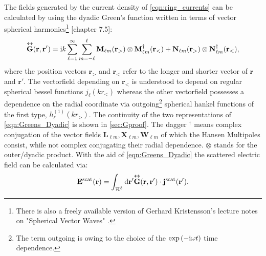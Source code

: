 The fields generated by the current density of \cref{eqn:ring_currents} can be
calculated by using the dyadic Green's function written in terms of vector spherical harmonics\footnote{There is also a freely available version of Gerhard Kristensson's lecture notes on "Spherical Vector Waves" \citep{Kristensson2014}.} \Cite{Kristensson2016}[chapter 7.5]:
\begin{equation}
\overset{\bm\leftrightarrow}{\mathbf{G}}(\mathbf{r},\mathbf{r}') = \mathrm{i} k \sum_{\ell=1}^\infty \sum_{m=-\ell}^\ell
\mathbf{M}_{\ell m}(\mathbf{r}_>)\otimes\mathbf{M}_{\ell m}^\dagger(\mathbf{r}_<)+
\mathbf{N}_{\ell m}(\mathbf{r}_>)\otimes\mathbf{N}_{\ell m}^\dagger(\mathbf{r}_<),
\label{eqn:Greens_Dyadic}
\end{equation}
where the position vectors $\mathbf{r}_>$ and $\mathbf{r}_<$ refer to the longer and shorter vector of $\mathbf{r}$ and $\mathbf{r}'$. The vectorfield depending on $\mathbf{r}_<$ is understood to depend on regular spherical bessel functions $j_\ell(kr_<)$ whereas the other vectorfield possesses a dependence on the radial coordinate via outgoing\footnote{The term outgoing is owing to the choice of the $\exp\left(-\mathrm{i}\omega t\right)$ time dependence.} spherical hankel functions of the first type, $h_\ell^{(1)}(kr_>)$. The continuity of the two representations of \cref{eqn:Greens_Dyadic} is shown in \cref{sec:Gproof}.
The dagger $^\dagger$ means complex conjugation of the vector fields $\mathbf{L}_{\ell m},\mathbf{X}_{\ell m},\mathbf{W}_{\ell m}$ of which the Hansen Multipoles consist, while not complex conjugating their radial dependence. $\otimes$ stands for the outer/dyadic product. With the aid of \cref{eqn:Greens_Dyadic} the scattered electric field can be calculated via:
\begin{equation}
\mathbf{E}^\text{scat}(\mathbf{r}) = \int_{\mathcal{R}^3}  \mathrm{d} \mathbf{r}' 
\overset{\bm\leftrightarrow}{\mathbf{G}}(\mathbf{r},\mathbf{r}') \cdot \mathbf{j}^\text{scat}(\mathbf{r}').
\label{eqn:E_scattered}
\end{equation}

